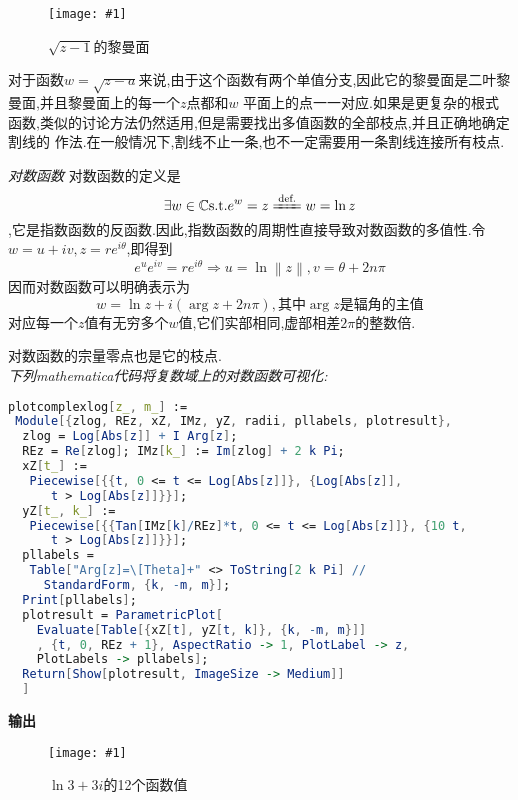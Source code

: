 \documentclass[UTF8]{ctexart}
\newcommand{\autographinsert}[1]{\texttt{[image: \#1]}}
\begin{document}
\begin{figure}[htb]
  \centering
  \autographinsert{RiemannOfSqrt[z-1].eps}
  \caption{$\sqrt{z-1}$的黎曼面}
  \label{1}
\end{figure}

对于函数$w=\sqrt{z-a}$来说,由于这个函数有两个单值分支,因此它的黎曼面是二叶黎曼面,并且黎曼面上的每一个$z$点都和$w$
平面上的点一一对应.如果是更复杂的根式函数,类似的讨论方法仍然适用,但是需要找出多值函数的全部枝点,并且正确地确定割线的
作法.在一般情况下,割线不止一条,也不一定需要用一条割线连接所有枝点.

\textit{对数函数}
对数函数的定义是
\begin{equation}
  \exists w\in\mathbb{C} \text{s.t.} e^{w}=z \xlongequal[]{\text{def.}} w=\ln z
\end{equation}
,它是指数函数的反函数.因此,指数函数的周期性直接导致对数函数的多值性.令$w=u+iv,z=re^{i\theta}$,即得到
\begin{equation}
  e^{u}e^{iv}=re^{i\theta}\Rightarrow u=\ln \left\| z \right\|,v=\theta+2n\pi
\end{equation}
因而对数函数可以明确表示为
\begin{equation}
  w=\ln z+i(\arg z+2n\pi),\text{其中}\arg z\text{是辐角的主值}
\end{equation}
对应每一个$z$值有无穷多个$w$值,它们实部相同,虚部相差$2\pi$的整数倍.

对数函数的宗量零点也是它的枝点. \\
\textit{下列mathematica代码将复数域上的对数函数可视化:}
\begin{lstlisting}[language=mathematica,style=mathematica]
  plotcomplexlog[z_, m_] :=
 Module[{zlog, REz, xZ, IMz, yZ, radii, pllabels, plotresult},
  zlog = Log[Abs[z]] + I Arg[z];
  REz = Re[zlog]; IMz[k_] := Im[zlog] + 2 k Pi;
  xZ[t_] :=
   Piecewise[{{t, 0 <= t <= Log[Abs[z]]}, {Log[Abs[z]],
      t > Log[Abs[z]]}}];
  yZ[t_, k_] :=
   Piecewise[{{Tan[IMz[k]/REz]*t, 0 <= t <= Log[Abs[z]]}, {10 t,
      t > Log[Abs[z]]}}];
  pllabels =
   Table["Arg[z]=\[Theta]+" <> ToString[2 k Pi] //
     StandardForm, {k, -m, m}];
  Print[pllabels];
  plotresult = ParametricPlot[
    Evaluate[Table[{xZ[t], yZ[t, k]}, {k, -m, m}]]
    , {t, 0, REz + 1}, AspectRatio -> 1, PlotLabel -> z,
    PlotLabels -> pllabels];
  Return[Show[plotresult, ImageSize -> Medium]]
  ]
\end{lstlisting}
\textbf{输出}

\begin{figure}[htb]
  \centering
  \autographinsert{3+3ilog.eps}
  \caption{$\ln 3+3i$的12个函数值}
  \label{2}
\end{figure}
\end{document}
